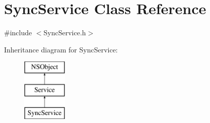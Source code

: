 \hypertarget{interface_sync_service}{
\section{\-Sync\-Service \-Class \-Reference}
\label{interface_sync_service}
}


{\ttfamily \#include $<$\-Sync\-Service.\-h$>$}

\-Inheritance diagram for \-Sync\-Service\-:\begin{figure}[H]
\begin{center}
\leavevmode
\includegraphics[height=3.000000cm]{interface_sync_service}
\end{center}
\end{figure}
